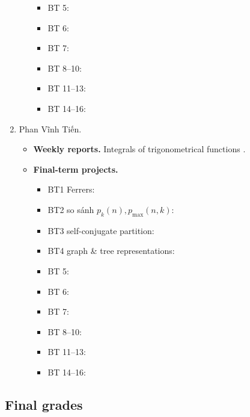 \documentclass{article}
\begin{document}
\begin{enumerate}
\begin{itemize}
\begin{itemize}
            \item BT 5:
            \item BT 6:
            \item BT 7:
            \item BT 8--10:
            \item BT 11--13:
            \item BT 14--16:
        \end{itemize}
    \end{itemize}
    \item {\sc Phan Vĩnh Tiến.}
    \begin{itemize}
        \item {\bf Weekly reports.} Integrals of trigonometrical functions .
        \item {\bf Final-term projects.}
        \begin{itemize}
            \item BT1 Ferrers:
            \item BT2 so sánh $p_k(n),p_{\max}(n,k)$:
            \item BT3 self-conjugate partition:
            \item BT4 graph \& tree representations:
            \item BT 5:
            \item BT 6:
            \item BT 7:
            \item BT 8--10:
            \item BT 11--13:
            \item BT 14--16:
        \end{itemize}
    \end{itemize}
\end{enumerate}


\subsection{Final grades}
\end{document}
